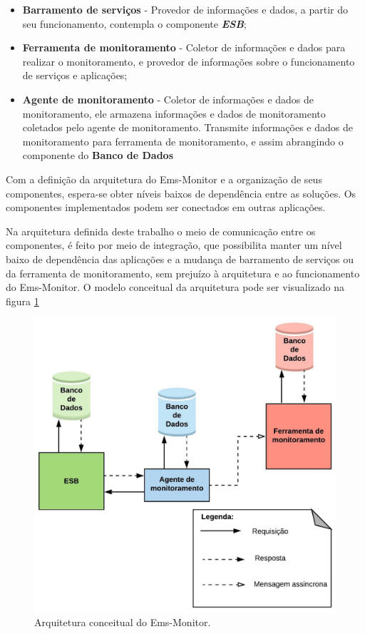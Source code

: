 \begin{itemize}
    \item \textbf{Barramento de serviços} - Provedor de informações e dados, a partir do seu funcionamento, contempla o componente \textbf{\textit{\acrshort{ESB}}}; 
    \item \textbf{Ferramenta de monitoramento} - Coletor de informações e dados para realizar o monitoramento, e provedor de informações sobre o funcionamento de serviços e aplicações; 
    \item \textbf{Agente de monitoramento} - Coletor de informações e dados de monitoramento, ele armazena informações e dados de monitoramento coletados pelo agente de monitoramento. Transmite informações e dados de monitoramento para ferramenta de monitoramento, e assim abrangindo o componente do \textbf{Banco de Dados}
\end{itemize}

Com a definição da arquitetura do Ems-Monitor e a organização de seus componentes, espera-se obter níveis baixos de dependência entre as soluções. Os componentes implementados podem ser conectados em outras aplicações. 

Na arquitetura definida deste trabalho o meio de comunicação entre os componentes, é feito por meio de integração, que possibilita manter um nível baixo de dependência das aplicações e a mudança de barramento de serviços ou da ferramenta de monitoramento, sem prejuízo à arquitetura e ao funcionamento do Ems-Monitor. O modelo conceitual da arquitetura pode ser visualizado na figura \ref{fun:fig:arquitetura_conceitual_monitoramento}

\begin{figure}[H]
	\begin{center}
	\includegraphics[scale = 0.90]{img/Arquitetura_Proposta_para_Monitoramento.jpeg}
		\caption{Arquitetura conceitual do Ems-Monitor.}
		\label{fun:fig:arquitetura_conceitual_monitoramento}
	\end{center}
\end{figure}

